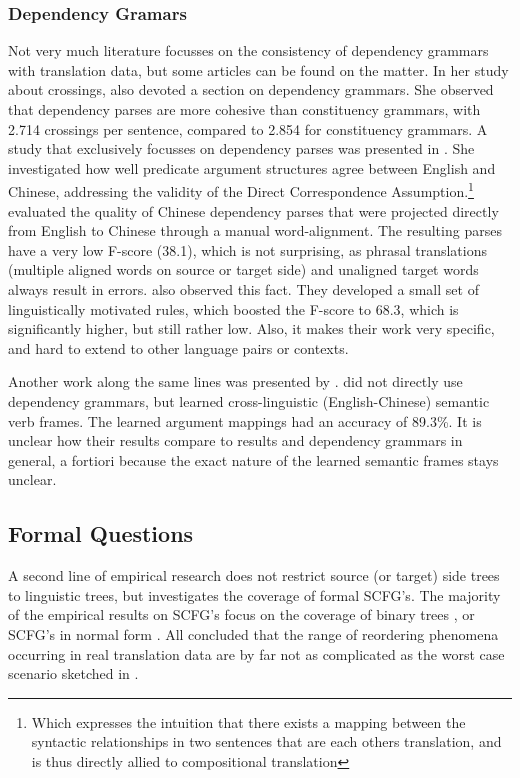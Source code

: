 \documentclass{report}
\begin{document}
\subsubsection{Dependency Gramars}

Not very much literature focusses on the consistency of dependency grammars with translation data, but some articles can be found on the matter. In her study about crossings, \citeauthor{fox2002phrasal} also devoted a section on dependency grammars. She observed that dependency parses are more cohesive than constituency grammars, with
2.714 crossings per sentence, compared to 2.854 for constituency grammars. A study that exclusively focusses on dependency parses was presented in \cite{hwa2002evaluating}. She investigated how well predicate argument structures agree between English and Chinese, addressing the validity of the Direct Correspondence Assumption.\footnote{Which expresses the intuition that there exists a mapping between the syntactic relationships in two sentences that are each others translation, and is thus directly allied to compositional translation} \citeauthor{hwa2002evaluating} evaluated the quality of Chinese dependency parses that were projected directly from English to Chinese through a manual word-alignment. The resulting parses have a very low F-score (38.1), which is not surprising, as phrasal translations (multiple aligned words on source or target side) and unaligned target words always result in errors. \citeauthor{hwa2002evaluating} also observed this fact. They developed a small set of linguistically motivated rules, which boosted the F-score to 68.3, which is significantly higher, but still rather low. Also, it makes their work very specific, and hard to extend to other language pairs or contexts.

Another work along the same lines was presented by \cite{fung2006automatic}. \citeauthor{fung2006automatic} did not directly use dependency grammars, but learned cross-linguistic (English-Chinese) semantic verb frames. The learned argument mappings  had an accuracy of 89.3\%. It is unclear how their results compare to  results and dependency grammars in general, a fortiori because the exact nature of the learned semantic frames stays unclear.

\subsection{Formal Questions}

A second line of empirical research does not restrict source (or target) side trees to linguistic trees, but investigates the coverage of formal SCFG's. The majority of the empirical results on SCFG's focus on the coverage of binary trees \citep[e.g.,]{zhang2006synchronous,huang2009binarization}, or SCFG's in normal form \citep[e.g.,][]{sogaard2009empirical1,sogaard2009empirical2,sogaard2010can}. All concluded that the range of reordering phenomena occurring in real translation data are by far not as complicated as the worst case scenario sketched in \cite{satta2005some}.
\end{document}
